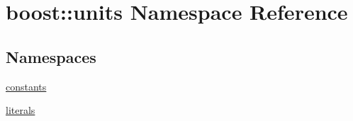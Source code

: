 \hypertarget{namespaceboost_1_1units}{}\section{boost\+:\+:units Namespace Reference}
\label{namespaceboost_1_1units}
\subsection*{Namespaces}
\begin{DoxyCompactItemize}
\item 
 \hyperlink{namespaceboost_1_1units_1_1constants}{constants}
\item 
 \hyperlink{namespaceboost_1_1units_1_1literals}{literals}
\end{DoxyCompactItemize}
